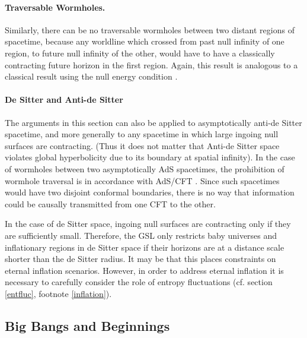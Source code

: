 \documentclass{article}
\begin{document}
\paragraph{Traversable Wormholes.} Similarly, there can be no traversable wormholes between two distant regions of spacetime, because any worldline which crossed from past null infinity of one region, to future null infinity of the other, would have to have a classically contracting future horizon in the first region.  Again, this result is analogous to a classical result using the null energy condition \cite{worm}.

\paragraph{De Sitter and Anti-de Sitter} The arguments in this section can also be applied to asymptotically anti-de Sitter spacetime, and more generally to any spacetime in which large ingoing null surfaces are contracting.  (Thus it does not matter that Anti-de Sitter space violates global hyperbolicity due to its boundary at spatial infinity).  In the case of wormholes between two asymptotically AdS spacetimes, the prohibition of wormhole traversal is in accordance with AdS/CFT \cite{GSWW}.  Since such spacetimes would have two disjoint conformal boundaries, there is no way that information could be causally transmitted from one CFT to the other.

In the case of de Sitter space, ingoing null surfaces are contracting only if they are sufficiently small.  Therefore, the GSL only restricts baby universes and inflationary regions in de Sitter space if their horizons are at a distance scale shorter than the de Sitter radius.  It may be that this places constraints on eternal inflation scenarios.  However, in order to address eternal inflation it is necessary to carefully consider the role of entropy fluctuations (cf. section \ref{entfluc}, footnote \ref{inflation}).

\subsection{Big Bangs and Beginnings}\label{begin}
\end{document}
